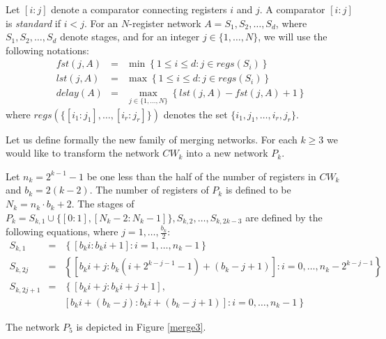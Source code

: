 \documentclass{llncs}
\newcommand{\braced}[1]{{\left\{#1\right\}}}
\newcommand{\fst}{\textit{fst}}
\newcommand{\lst}{\textit{lst}}
\begin{document}
Let $[i:j]$ denote a comparator connecting registers $i$ and $j$. A
comparator $[i:j]$ is {\em standard} if $i<j$.  For an $N$-register
network $A = S_1,S_2,\ldots,S_d$, where $S_1,S_2,\ldots,S_{d}$ denote
stages, and for an integer $j\in\{1,\ldots,N\}$, we will use the
following notations:
\begin{eqnarray}
   \fst(j,A) &  = & \min\braced{1\le i\le d: j \in regs(S_i)}\\
   \lst(j,A) &  = & \max\braced{1\le i\le d: j \in regs(S_i)}\\
   delay(A) &  = & \max_{j\in\{1,\ldots,N\}}\braced{\lst(j,A)-\fst(j,A)+1}
\end{eqnarray}
where $regs(\{[i_1:j_1], \ldots, [i_r:j_r]\})$ denotes the set
$\{i_1, j_1, \ldots, i_r, j_r\}$.

Let us define formally the new family of merging networks.  For each
$k\ge 3$ we would like to transform the network $CW_k$ into a new
network $P_k$. 
\begin{definition}\label{defMk}
  Let $n_k=2^{k-1}-1$ be one less than the half of the number of
  registers in $CW_k$ and $b_k=2(k-2)$. The number of registers of $P_k$
  is defined to be $N_k=n_k\cdot b_k+2$. The stages of $P_k =
  S_{k,1}\cup\{[0:1],[N_k-2:N_k-1]\}, S_{k,2},\ldots,S_{k,2k-3}$ are defined by
  the following equations, where $j=1,\ldots,\frac{b_k}{2}$:
\begin{eqnarray}
S_{k,1} & = & \braced{[b_ki:b_ki+1]: i=1,\ldots,n_k-1}\\
S_{k,2j} & = & \braced{[b_ki+j:b_k(i+2^{k-j-1}-1)+(b_k-j+1)]: 
          i=0,\ldots,n_k-2^{k-j-1}}\\ 
S_{k,2j+1} & = & \left\{[b_ki+j:b_ki+j+1],\right.\\
         &   & \left. [b_ki+(b_k-j):b_ki+(b_k-j+1)]: i=0,\ldots,n_k-1 \right\}
\end{eqnarray}
\end{definition}

The network $P_5$ is depicted in Figure \ref{merge3}.
\end{document}
